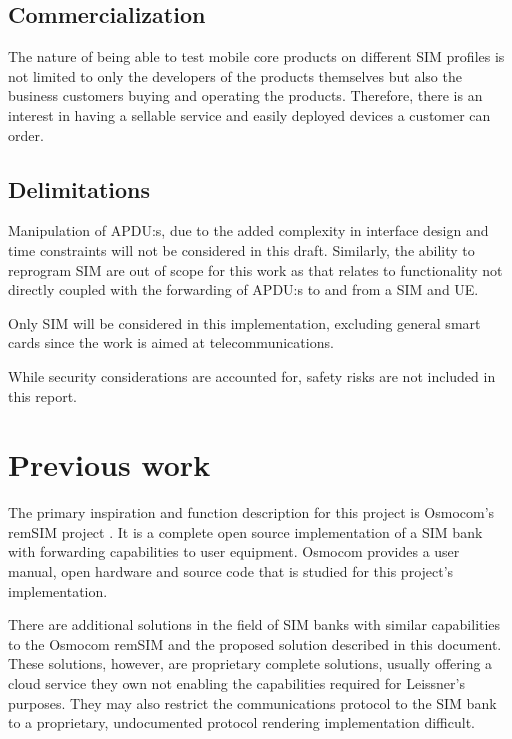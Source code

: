 \subsection{Commercialization}

The nature of being able to test mobile core products on different
SIM profiles is not limited to only the developers of the products
themselves but also the business customers buying and operating the
products. Therefore, there is an interest in having a sellable
service and easily deployed devices a customer can order.

\subsection{Delimitations}

Manipulation of APDU:s, due to the added complexity in interface
design and time constraints will not be considered in this draft.
Similarly, the ability to reprogram SIM are out of scope for this
work as that relates to functionality not directly coupled with
the forwarding of APDU:s to and from a SIM and UE.

Only SIM will be considered in this implementation, excluding
general smart cards since the work is aimed at telecommunications.

While security considerations are accounted for, safety risks are
not included in this report.

\section{Previous work}

The primary inspiration and function description for this project
is Osmocom's remSIM project \cite{osmocom-remsim}. It is a
complete open source implementation of a SIM bank with forwarding
capabilities to user equipment. Osmocom provides a user manual,
open hardware and source code that is studied for this project's
implementation.

There are additional solutions in the field of SIM banks with
similar capabilities to the Osmocom remSIM and the proposed
solution described in this document. These solutions, however, are
proprietary \cite{polygator-sim-bank} complete solutions, usually
offering a cloud service they own \cite{placeholder-source-cloud-sim-bank}
not enabling the capabilities required for Leissner's purposes.
They may also restrict the communications protocol to the SIM bank
to a proprietary, undocumented protocol rendering implementation
difficult.

